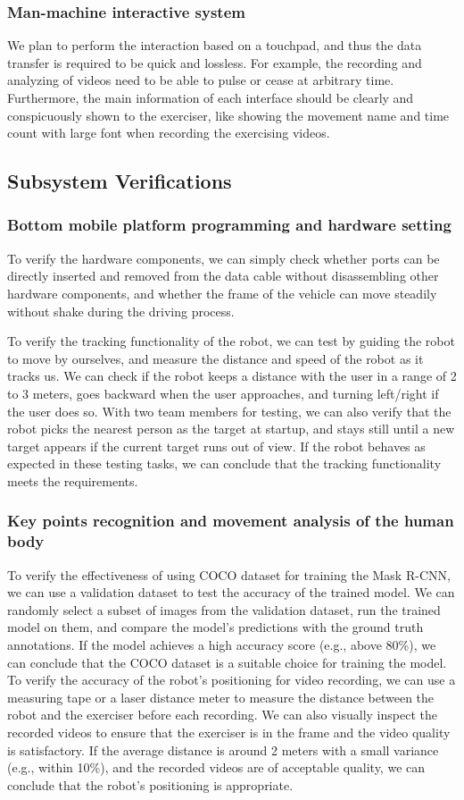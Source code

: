\subsubsection{Man-machine interactive system}
We plan to perform the interaction based on a touchpad, and thus the data transfer is required to be quick and lossless. For example, the recording and analyzing of videos need to be able to pulse or cease at arbitrary time. Furthermore, the main information of each interface should be clearly and conspicuously shown to the exerciser, like showing the movement name and time count with large font when recording the exercising videos.


\subsection{Subsystem Verifications}
\subsubsection{Bottom mobile platform programming and hardware setting}
To verify the hardware components, we can simply check whether ports can be directly inserted and removed from the data cable without disassembling other hardware components, and whether the frame of the vehicle can move steadily without shake during the driving process.

To verify the tracking functionality of the robot, we can test by guiding the robot to move by ourselves, and measure the distance and speed of the robot as it tracks us. We can check if the robot keeps a distance with the user in a range of 2 to 3 meters, goes backward when the user approaches, and turning left/right if the user does so. With two team members for testing, we can also verify that the robot picks the nearest person as the target at startup, and stays still until a new target appears if the current target runs out of view. If the robot behaves as expected in these testing tasks, we can conclude that the tracking functionality meets the requirements.
\subsubsection{Key points recognition and movement analysis of the human body}
To verify the effectiveness of using COCO dataset for training the Mask R-CNN, we can use a validation dataset to test the accuracy of the trained model. We can randomly select a subset of images from the validation dataset, run the trained model on them, and compare the model's predictions with the ground truth annotations. If the model achieves a high accuracy score (e.g., above 80\%), we can conclude that the COCO dataset is a suitable choice for training the model.
To verify the accuracy of the robot's positioning for video recording, we can use a measuring tape or a laser distance meter to measure the distance between the robot and the exerciser before each recording. We can also visually inspect the recorded videos to ensure that the exerciser is in the frame and the video quality is satisfactory. If the average distance is around 2 meters with a small variance (e.g., within 10\%), and the recorded videos are of acceptable quality, we can conclude that the robot's positioning is appropriate.

